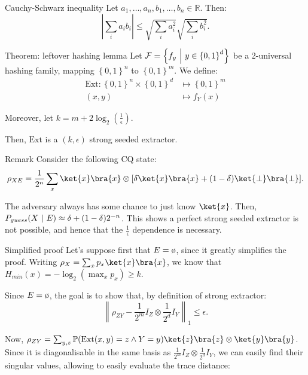 \documentclass[a4paper]{article}
\begin{document}
\begin{parag}{Cauchy-Schwarz inequality}
    Let $a_1, \ldots, a_n, b_1, \ldots, b_n \in \mathbb{R}$. Then:
    \[\left|\sum_{i} a_i b_i\right| \leq \sqrt{\sum_{i} a_i^2} \sqrt{\sum_{i} b_i^2}.\]
\end{parag}


\begin{parag}{Theorem: leftover hashing lemma}
    Let $\mathcal{F} = \left\{f_y \suchthat y \in \left\{0, 1\right\}^d\right\}$ be a 2-universal hashing family, mapping $\left\{0, 1\right\}^n$ to $\left\{0, 1\right\}^m$. We define:
    \[\begin{split}
    \text{Ext}: \left\{0,1\right\}^n \times \left\{0, 1\right\}^d &\longmapsto \left\{0, 1\right\}^m \\
    \left(x, y\right) &\longmapsto f_Y\left(x\right)
    \end{split}\]
    
    Moreover, let $k = m + 2 \log_2\left(\frac{1}{\epsilon}\right)$.

    Then, $\text{Ext}$ is a $\left(k, \epsilon\right)$ strong seeded extractor.

    \begin{subparag}{Remark}
        Consider the following CQ state: 
        \[\rho_{XE} = \frac{1}{2^n} \sum_{x} \ket{x}\bra{x} \otimes \left[\delta \ket{x}\bra{x} + \left(1 - \delta\right) \ket{\perp}\bra{\perp}\right].\]
        
        The adversary always has some chance to just know $\ket{x}$. Then, $P_{guess}\left(X \suchthat E\right) \approx \delta+ \left(1 - \delta\right)2^{-n}$. This shows a perfect strong seeded extractor is not possible, and hence that the $\frac{1}{\epsilon}$ dependence is necessary.
    \end{subparag}

    \begin{subparag}{Simplified proof}
        Let's suppose first that $E = \o$, since it greatly simplifies the proof. Writing $\rho_X = \sum_{x} p_x \ket{x}\bra{x}$, we know that $H_{min}\left(x\right) = - \log_2\left(\max_x p_x\right) \geq k$.

        Since $E = \o$, the goal is to show that, by definition of strong extractor:
        \[\left\|\rho_{ZY} - \frac{1}{2^m} I_Z \otimes \frac{1}{2^d} I_Y\right\|_1 \leq \epsilon.\]

        Now, $\rho_{ZY} = \sum_{y, z} \prob\left(\text{Ext}\left(x, y\right) = z \land Y = y\right) \ket{z}\bra{z} \otimes \ket{y}\bra{y}$. Since it is diagonalisable in the same basis as $\frac{1}{2^m} I_Z \otimes \frac{1}{2^d} I_Y$, we can easily find their singular values, allowing to easily evaluate the trace distance:


\end{subparag}
\end{parag}
\end{document}
